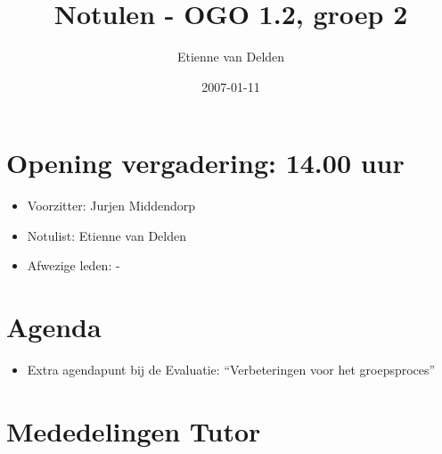 \documentclass[]{article}
\title{Notulen - OGO 1.2, groep 2}
\author{ Etienne van Delden \\ }
\date{2007-01-11}
\begin{document}
\ifpdf
{}
\else
{}
\fi

\maketitle


\section{Opening vergadering: 14.00 uur }
  \begin{itemize}
    \item Voorzitter: Jurjen Middendorp	
    \item Notulist: Etienne van Delden
    \item Afwezige leden: - 
  \end{itemize}

\section{Agenda}

  \begin{itemize}
     \item Extra agendapunt bij de Evaluatie: ``Verbeteringen voor het groepsproces''
  \end{itemize}





\section{Mededelingen Tutor}
\end{document}
